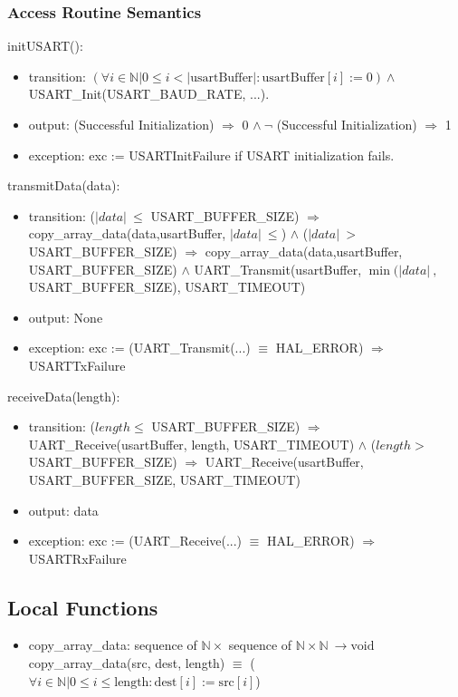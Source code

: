 \documentclass[12pt, titlepage]{article}
\begin{document}
\subsubsection{Access Routine Semantics}
\noindent initUSART():
\begin{itemize}
\item transition: \((\forall i \in \mathbb{N} | 0 \le i < |\text{usartBuffer}|:
\text{usartBuffer}[i] := 0) \wedge\)\\
  USART\_Init(USART\_BAUD\_RATE, ...).
\item output: (Successful Initialization) \(\Rightarrow\) 0 \(\wedge\ \neg\)
  (Successful Initialization) \(\Rightarrow\) 1
\item exception: exc := USARTInitFailure if USART initialization fails.
\end{itemize}

\noindent transmitData(data):
\begin{itemize}
  \item transition: (\(\vert data \vert\ \leq \) USART\_BUFFER\_SIZE)
   \(\Rightarrow\) copy\_array\_data(data,usartBuffer, \(\vert data \vert\ \leq
   \)) \(\wedge\) (\(\vert data \vert\ > \) USART\_BUFFER\_SIZE) \(\Rightarrow\)
   copy\_array\_data(data,usartBuffer, USART\_BUFFER\_SIZE) \(\wedge\)
   UART\_Transmit(usartBuffer, \(\min(\vert data \vert\ ,\)
   USART\_BUFFER\_SIZE), USART\_TIMEOUT)
  \item output: None
  \item exception: exc := (UART\_Transmit(...) \(\equiv\) HAL\_ERROR)
  \(\Rightarrow\) USARTTxFailure 
\end{itemize}

\noindent receiveData(length):
\begin{itemize}
  \item transition: (\(length \leq \) USART\_BUFFER\_SIZE) \(\Rightarrow\)
    UART\_Receive(usartBuffer, length, USART\_TIMEOUT) \(\wedge\) (\(length > \)
    USART\_BUFFER\_SIZE) \(\Rightarrow\) UART\_Receive(usartBuffer,
    USART\_BUFFER\_SIZE, USART\_TIMEOUT)
  \item output: data
  \item exception: exc := (UART\_Receive(...) \(\equiv\) HAL\_ERROR)
  \(\Rightarrow\) USARTRxFailure
\end{itemize}

\subsection{Local Functions}
\begin{itemize}
  \item copy\_array\_data: sequence of \(\mathbb{N} \times\) sequence of
  \(\mathbb{N} \times \mathbb{N}\ \rightarrow \text{void}\)  \\
  copy\_array\_data(src, dest, length) \(\equiv\) (\(\forall i \in \mathbb{N} |
  0 \le i \le \text{length} : \text{dest}[i] := \text{src}[i]\))
\end{itemize}
\end{document}
